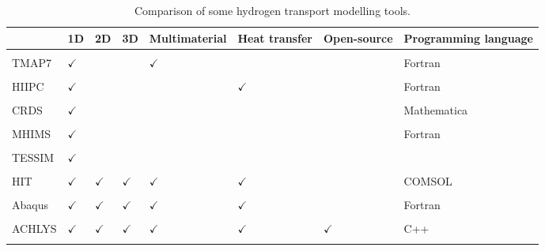 \begin{table} [h]
    \centering
    \begin{tabular}{L{2cm} L{0.5cm} L{0.5cm} L{0.6cm} L{1.7cm} l l l }
        & 1D & 2D & 3D & Multimaterial & Heat transfer & Open-source & Programming language \\
        \hline \\
        TMAP7 \cite{longhurst_tmap7_2008} & $\checkmark$ & & & $\checkmark$ & & & Fortran\\
        \\
        HIIPC \cite{sang_modelling_2012} & $\checkmark$ & & & & $\checkmark$ & & Fortran\\
        \\
        CRDS \cite{matveev_reaction-diffusion_2018} & $\checkmark$ & & & & & & Mathematica \\
        \\
        MHIMS \cite{hodille_study_2016} & $\checkmark$ & & & & & & Fortran \\
        \\
        TESSIM \cite{schmid_transport_2014} & $\checkmark$ & & & & & & \\
        \\
        HIT \cite{candido_integrated_2020} & $\checkmark$ & $\checkmark$ & $\checkmark$ & $\checkmark$ & $\checkmark$ & & COMSOL\\
        \\
        Abaqus \cite{benannoune_multidimensional_2020} & $\checkmark$ & $\checkmark$ & $\checkmark$ & $\checkmark$ & $\checkmark$ & & Fortran\\
        \\
        ACHLYS \cite{stephen-dixon_aurora-multiphysicsachlys_2021} & $\checkmark$ & $\checkmark$ & $\checkmark$ & $\checkmark$ & $\checkmark$ & $\checkmark$ & C++\\
        \\
    \end{tabular}
    \caption{Comparison of some hydrogen transport modelling tools.}
\end{table}

